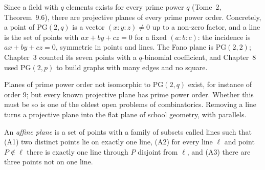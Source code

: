 Since a field with $q$ elements exists for every prime power $q$ (Tome~2, Theorem~9.6), there are projective planes of every prime power order. Concretely, a point of $\mathrm{PG}(2,q)$ is a
vector $(x:y:z)\ne0$ up to a non-zero factor, and a line is the set of points with $ax+by+cz=0$ for a fixed $(a:b:c)$: the incidence is $ax+by+cz=0$, symmetric in points and lines.
The Fano plane is $\mathrm{PG}(2,2)$; Chapter~3 counted its seven points with a $q$-binomial coefficient, and Chapter~8 used $\mathrm{PG}(2,p)$ to build graphs with many edges and no square.

Planes of prime power order not isomorphic to $\mathrm{PG}(2,q)$ exist, for instance of order $9$; but every known projective plane has prime power order. Whether this must be so is
one of the oldest open problems of combinatorics. Removing a line turns a projective plane into the flat plane of school geometry, with parallels.

\begin{definition}\label{def:affine}
An \emph{affine plane} is a set of points with a family of subsets called lines such that (A1) two distinct points lie on exactly one line, (A2) for every line $\ell$ and point $P\notin\ell$ there is exactly
one line through $P$ disjoint from $\ell$, and (A3) there are three points not on one line.
\end{definition}


